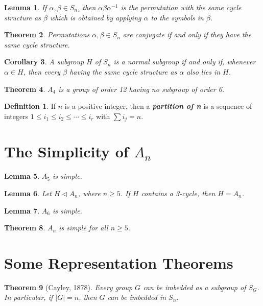 \documentclass[12pt]{report}
\newtheorem{theorem}{Theorem}[chapter]
\newtheorem{corollary}[theorem]{Corollary}
\newtheorem{lemma}[theorem]{Lemma}
\theoremstyle{definition}
\newtheorem*{definition}{Definition}
\newcommand{\term}[1]{\textbf{\textit{#1}}}
\begin{document}
\begin{lemma}
	If $\alpha,\beta\in S_n$, then $\alpha\beta\alpha^{-1}$ is the permutation with the same cycle structure as $\beta$ which is
	obtained by applying $\alpha$ to the symbols in $\beta$.
\end{lemma}

\begin{theorem}
	Permutations $\alpha,\beta\in S_n$ are conjugate if and only if they have the same cycle structure.
\end{theorem}

\begin{corollary}
	A subgroup $H$ of $S_n$ is a normal subgroup if and only if, whenever $\alpha\in H$, then every $\beta$ having the same
	cycle structure as $\alpha$ also lies in $H$.
\end{corollary}

\begin{theorem}
	$A_4$ is a group of order 12 having no subgroup of order 6.
\end{theorem}

\begin{definition}
	If $n$ is a positive integer, then a \term{partition of n} is a sequence of integers $1\leq i_1\leq i_2\leq\cdots\leq i_r$ with $\sum i_j = n$.
\end{definition}

\section{The Simplicity of $A_n$}

\begin{lemma}
	$A_5$ is simple.
\end{lemma}

\begin{lemma}
	Let $H\vartriangleleft A_n$, where $n\geq 5$. If $H$ contains a 3-cycle, then $H = A_n$.
\end{lemma}

\begin{lemma}
	$A_6$ is simple.
\end{lemma}

\begin{theorem}
	$A_n$ is simple for all $n\geq 5$.
\end{theorem}

\section{Some Representation Theorems}
\begin{theorem}[Cayley, 1878]
	Every group $G$ can be imbedded as a subgroup of $S_G$. In particular, if $|G|=n$, then $G$ can be imbedded in $S_n$.
\end{theorem}
\end{document}

